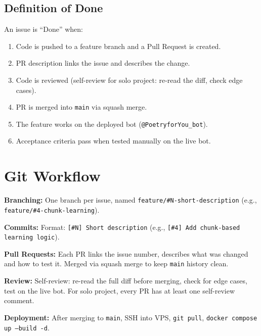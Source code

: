 \documentclass[11pt, a4paper]{article}
\begin{document}

\subsection*{Definition of Done}

An issue is ``Done'' when:
\begin{enumerate}
    \item Code is pushed to a feature branch and a Pull Request is created.
    \item PR description links the issue and describes the change.
    \item Code is reviewed (self-review for solo project: re-read the diff, check edge cases).
    \item PR is merged into \texttt{main} via squash merge.
    \item The feature works on the deployed bot (\texttt{@PoetryforYou\_bot}).
    \item Acceptance criteria pass when tested manually on the live bot.
\end{enumerate}


\section{Git Workflow}

\textbf{Branching:} One branch per issue, named \texttt{feature/\#N-short-description} (e.g., \texttt{feature/\#4-chunk-learning}).

\textbf{Commits:} Format: \texttt{[\#N] Short description} (e.g., \texttt{[\#4] Add chunk-based learning logic}).

\textbf{Pull Requests:} Each PR links the issue number, describes what was changed and how to test it. Merged via squash merge to keep \texttt{main} history clean.

\textbf{Review:} Self-review: re-read the full diff before merging, check for edge cases, test on the live bot. For solo project, every PR has at least one self-review comment.

\textbf{Deployment:} After merging to \texttt{main}, SSH into VPS, \texttt{git pull}, \texttt{docker compose up --build -d}.
\end{document}
